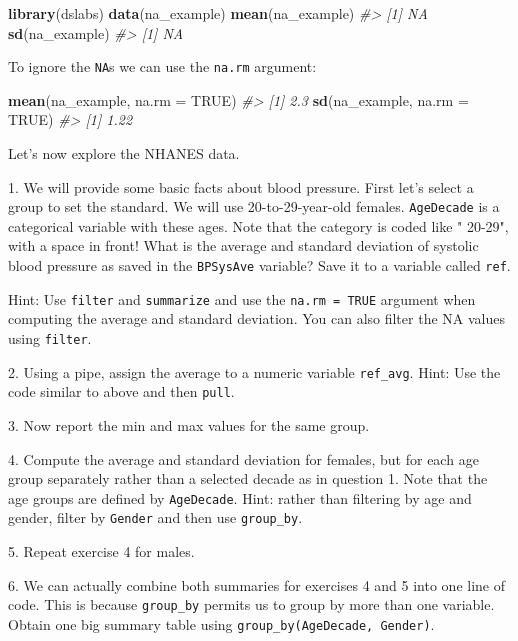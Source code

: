 \documentclass[
]{krantz}
\newenvironment{Shaded}{\begin{snugshade}}{\end{snugshade}}
\newcommand{\CommentTok}[1]{\textcolor[rgb]{0.37,0.37,0.37}{\textit{#1}}}
\newcommand{\DataTypeTok}[1]{\textcolor[rgb]{0.27,0.27,0.27}{#1}}
\newcommand{\KeywordTok}[1]{\textcolor[rgb]{0.27,0.27,0.27}{\textbf{#1}}}
\newcommand{\NormalTok}[1]{#1}
\newcommand{\OtherTok}[1]{\textcolor[rgb]{0.37,0.37,0.37}{#1}}
\begin{document}
\begin{Shaded}
\begin{Highlighting}[]
\KeywordTok{library}\NormalTok{(dslabs)}
\KeywordTok{data}\NormalTok{(na_example)}
\KeywordTok{mean}\NormalTok{(na_example)}
\CommentTok{#> [1] NA}
\KeywordTok{sd}\NormalTok{(na_example)}
\CommentTok{#> [1] NA}
\end{Highlighting}
\end{Shaded}

To ignore the \texttt{NA}s we can use the \texttt{na.rm} argument:

\begin{Shaded}
\begin{Highlighting}[]
\KeywordTok{mean}\NormalTok{(na_example, }\DataTypeTok{na.rm =} \OtherTok{TRUE}\NormalTok{)}
\CommentTok{#> [1] 2.3}
\KeywordTok{sd}\NormalTok{(na_example, }\DataTypeTok{na.rm =} \OtherTok{TRUE}\NormalTok{)}
\CommentTok{#> [1] 1.22}
\end{Highlighting}
\end{Shaded}

Let's now explore the NHANES data.

1. We will provide some basic facts about blood pressure. First let's select a group to set the standard. We will use 20-to-29-year-old females. \texttt{AgeDecade} is a categorical variable with these ages. Note that the category is coded like " 20-29", with a space in front! What is the average and standard deviation of systolic blood pressure as saved in the \texttt{BPSysAve} variable? Save it to a variable called \texttt{ref}.

Hint: Use \texttt{filter} and \texttt{summarize} and use the \texttt{na.rm\ =\ TRUE} argument when computing the average and standard deviation. You can also filter the NA values using \texttt{filter}.

2. Using a pipe, assign the average to a numeric variable \texttt{ref\_avg}. Hint: Use the code similar to above and then \texttt{pull}.

3. Now report the min and max values for the same group.

4. Compute the average and standard deviation for females, but for each age group separately rather than a selected decade as in question 1. Note that the age groups are defined by \texttt{AgeDecade}. Hint: rather than filtering by age and gender, filter by \texttt{Gender} and then use \texttt{group\_by}.

5. Repeat exercise 4 for males.

6. We can actually combine both summaries for exercises 4 and 5 into one line of code. This is because \texttt{group\_by} permits us to group by more than one variable. Obtain one big summary table using \texttt{group\_by(AgeDecade,\ Gender)}.
\end{document}
